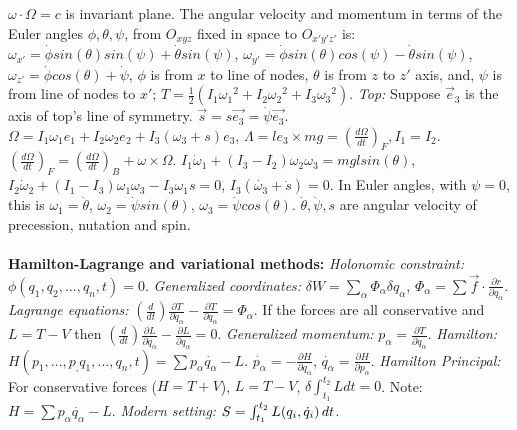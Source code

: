 $\omega \cdot \Omega=c$ is invariant plane. The angular velocity and momentum in
terms of the Euler angles $\phi,\theta, \psi$, from $O_{xyz}$ fixed in space
to $O_{x'y'z'}$ is:
$\omega_{x'}= \dot{\phi} sin( \theta ) sin ( \psi ) + \dot { \theta} sin ( \psi )$,
$\omega_{y'}= \dot{\phi} sin( \theta ) cos ( \psi ) - \dot { \theta} sin ( \psi )$,
$\omega_{z'}= \dot{\phi} cos( \theta ) + \dot { \psi }$, $\phi$ is from $x$ to line of
nodes, 
$\theta$ is from $z$ to $z'$ axis, and, 
$\psi$ is from line of nodes to $x'$;
$T= {\frac 1 2}(I_1 {\omega_1}^2+ I_2 {\omega_2}^2 + I_3 {\omega_3}^2)$.
\emph{Top:}  Suppose $\vec{e}_3$ is the axis of top's line of symmetry.
$\vec{s}= s\vec{e_3}= \dot {\psi} \vec{e_3}$.
$\Omega= I_1 \omega_1 e_1 + I_2 \omega_2 e_2 + I_3 (\omega_3 +s) e_3$, 
$\Lambda= l e_3 \times mg= ({\frac {d \Omega} {dt}})_F, I_1=I_2$.
$ ({\frac {d \Omega} {dt}})_F= ({\frac {d \Omega} {dt}})_B + \omega \times \Omega$.
$I_1 {\dot{\omega}}_1 + (I_3 - I_2) \omega_2 \omega_3 = mgl sin ( \theta )$, 
$I_2 {\dot{\omega}}_2 + (I_1 - I_3) \omega_1 \omega_3 - I_3 \omega_1 s= 0$,
$I_3 (\dot{\omega_3} + \dot{s})= 0$. In Euler angles, with $\psi=0$, this is
$\omega_1= \dot{\theta}$, $\omega_2= \dot{\psi} sin (\theta )$,
$\omega_3= \dot{\psi} cos ( \theta )$. $\dot{\theta},\dot{\psi}, s$ are angular velocity
of precession, nutation and spin.
\\
\\
{\bf Hamilton-Lagrange and variational methods:}
\emph{Holonomic constraint:} $\phi(q_1 , q_2 , ... ,q_n , t)=0$.  \emph{Generalized
coordinates:}
$\delta W= \sum_{\alpha} \Phi_{\alpha} \delta q_{\alpha}$,
$\Phi_{\alpha} =
\sum \vec{f} \cdot {\frac {\partial r} {\partial q_{\alpha}}}$.  
\emph{Lagrange equations:} $({\frac d {dt}})
{\frac {\partial T} {\partial {\dot {q}}_{\alpha}}}-
{\frac {\partial T} {\partial q_{\alpha}}}= \Phi_{\alpha}$.  
If the forces are all conservative and $L=T-V$ then
$({\frac d {dt}})
{\frac {\partial L} {\partial {\dot {q}}_{\alpha}}}-
{\frac {\partial L} {\partial q_{\alpha}}}= 0$.  \emph{Generalized momentum:}
$p_{\alpha}= {\frac {\partial T} {\partial {\dot q}_{\alpha}}}$.
\emph{Hamilton:}
$H(p_1 , ..., p_, q_1 , ..., q_n , t)= \sum p_{\alpha} \dot{q_{\alpha}} - L$.
$\dot{p_{\alpha}}= -{\frac {\partial H} {\partial q_{\alpha}}}$,
$\dot{q_{\alpha}}= {\frac {\partial H} {\partial p_{\alpha}}}$.
\emph{Hamilton Principal:} For conservative forces ($H=T+V$),
$L=T-V$, $\delta \int_{t_1}^{t_2} L dt = 0$.  
Note: $H= \sum p_{\alpha} \dot{q_{\alpha}} - L$.
\emph{Modern setting:} $S= \int_{t_1}^{t_2} L(q_i, {\dot {q}}_i) \thinspace dt$.
